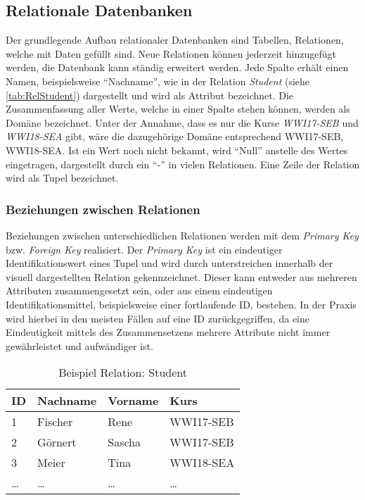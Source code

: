 \subsection{Relationale Datenbanken}

Der grundlegende Aufbau relationaler Datenbanken sind Tabellen, Relationen, welche mit Daten gefüllt sind. 
Neue Relationen können jederzeit hinzugefügt werden, die Datenbank kann ständig erweitert werden.
Jede Spalte erhält einen Namen, beispielsweise \enquote{Nachname}, wie in der Relation \emph{Student} (siehe \vref{tab:RelStudent}) dargestellt und wird als Attribut bezeichnet. 
Die Zusammenfassung aller Werte, welche in einer Spalte stehen können, werden als Domäne bezeichnet.
Unter der Annahme, dass es nur die Kurse \emph{WWI17-SEB} und \emph{WWI18-SEA} gibt, wäre die
dazugehörige Domäne entsprechend {WWI17-SEB, WWI18-SEA}. 
Ist ein Wert noch nicht bekannt, wird \enquote{Null} anstelle des Wertes eingetragen, dargestellt durch ein \enquote{-} in vielen
Relationen. 
Eine Zeile der Relation wird als Tupel bezeichnet.\autocite[vgl. S.9 ff.][]{Book_DB_2}


\subsubsection{Beziehungen zwischen Relationen}
Beziehungen zwischen unterschiedlichen Relationen werden mit dem \emph{Primary Key} bzw. \emph{Foreign Key} realisiert. 
Der \emph{Primary Key} ist ein eindeutiger Identifikationswert eines Tupel und wird durch unterstreichen innerhalb der visuell dargestellten Relation gekennzeichnet. 
Dieser kann entweder aus mehreren Attributen zusammengesetzt sein, oder aus einem eindeutigen Identifikationsmittel, beispielsweise einer fortlaufende ID, bestehen. 
In der Praxis wird hierbei in den meisten Fällen auf eine ID zurückgegriffen, da eine Eindeutigkeit mittels des Zusammensetzens mehrere Attribute nicht immer gewährleistet und aufwändiger ist.\autocite[vgl. S.38][]{Book_DB_2}


\begin{table}
    \begin{tabular}[h]{l | l | l | l}
        ID & Nachname & Vorname & Kurs \\ \hline
        1 & Fischer & Rene & WWI17-SEB \\
        2 & Görnert & Sascha & WWI17-SEB \\
        3 & Meier & Tina & WWI18-SEA \\
        \dots & \dots & \dots & \dots \\
        \end{tabular}
        \caption{Beispiel Relation: Student}
        \label{tab:RelStudent}
\end{table}

